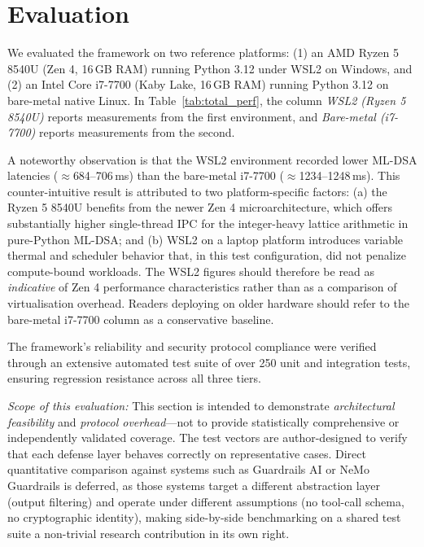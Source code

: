 \documentclass[conference]{IEEEtran}
\begin{document}
\section{Evaluation}
We evaluated the framework on two reference platforms: (1) an AMD Ryzen 5 8540U (Zen 4, 16\,GB RAM) running Python 3.12 under WSL2 on Windows, and (2) an Intel Core i7-7700 (Kaby Lake, 16\,GB RAM) running Python 3.12 on bare-metal native Linux. In Table~\ref{tab:total_perf}, the column \textit{WSL2 (Ryzen 5 8540U)} reports measurements from the first environment, and \textit{Bare-metal (i7-7700)} reports measurements from the second.

A noteworthy observation is that the WSL2 environment recorded lower ML-DSA latencies ($\approx$684--706\,ms) than the bare-metal i7-7700 ($\approx$1234--1248\,ms). This counter-intuitive result is attributed to two platform-specific factors: (a) the Ryzen 5 8540U benefits from the newer Zen 4 microarchitecture, which offers substantially higher single-thread IPC for the integer-heavy lattice arithmetic in pure-Python ML-DSA; and (b) WSL2 on a laptop platform introduces variable thermal and scheduler behavior that, in this test configuration, did not penalize compute-bound workloads. The WSL2 figures should therefore be read as \emph{indicative} of Zen 4 performance characteristics rather than as a comparison of virtualisation overhead. Readers deploying on older hardware should refer to the bare-metal i7-7700 column as a conservative baseline.

The framework's reliability and security protocol compliance were verified through an extensive automated test suite of over 250 unit and integration tests, ensuring regression resistance across all three tiers.

\textit{Scope of this evaluation:} This section is intended to demonstrate \textit{architectural feasibility} and \textit{protocol overhead}---not to provide statistically comprehensive or independently validated coverage. The test vectors are author-designed to verify that each defense layer behaves correctly on representative cases. Direct quantitative comparison against systems such as Guardrails AI or NeMo Guardrails is deferred, as those systems target a different abstraction layer (output filtering) and operate under different assumptions (no tool-call schema, no cryptographic identity), making side-by-side benchmarking on a shared test suite a non-trivial research contribution in its own right.
\end{document}

